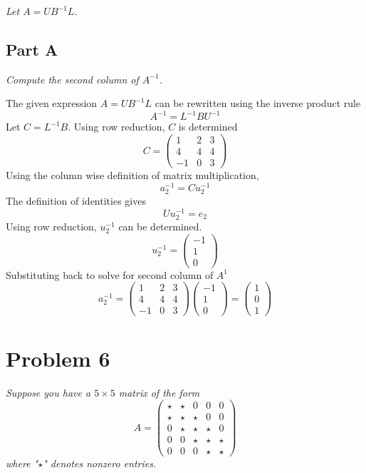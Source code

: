 \documentclass{article}
\begin{document}
\textit{Let $A = U B^{-1} L$.}

\subsection*{Part A}

\textit{Compute the second column of $A^{-1}$.}

\bigbreak

The given expression $ A = U B^{-1} L $ can be rewritten using the inverse
product rule
$$ A^{-1} = L^{-1} B U^{-1} $$
Let $ C = L^{-1} B $. Using row reduction, $ C $ is determined
\[
    C = \begin{pmatrix}
        1 & 2 & 3 \\
        4 & 4 & 4 \\
        -1 & 0 & 3
    \end{pmatrix}
\]
Using the column wise definition of matrix multiplication,
$$ a_2^{-1} = C u_2^{-1} $$
The definition of identities gives
$$ U u_2^{-1} = e_2 $$
Using row reduction, $ u_2^{-1} $ can be determined.
\[
    u_2^{-1} = \begin{pmatrix}
        -1 \\
        1 \\
        0
    \end{pmatrix}
\]
Substituting back to solve for second column of $ A^{1} $
\[
    a_2^{-1} = \begin{pmatrix}
        1 & 2 & 3 \\
        4 & 4 & 4 \\
        -1 & 0 & 3
    \end{pmatrix}
    \begin{pmatrix}
        -1 \\
        1 \\
        0
    \end{pmatrix}
    = \begin{pmatrix}
        1 \\
        0 \\
        1
    \end{pmatrix}
\]

\section*{Problem 6}

\textit{Suppose you have a $5 \times 5$ matrix of the form}
$$A = \begin{pmatrix}
    \star & \star & 0 & 0 & 0 \\
    \star & \star & \star & 0 & 0 \\
    0 & \star & \star & \star & 0 \\
    0 & 0 & \star & \star & \star \\
    0 & 0 & 0 & \star & \star
\end{pmatrix}
$$
\textit{where "$\star$" denotes nonzero entries.}
\end{document}
